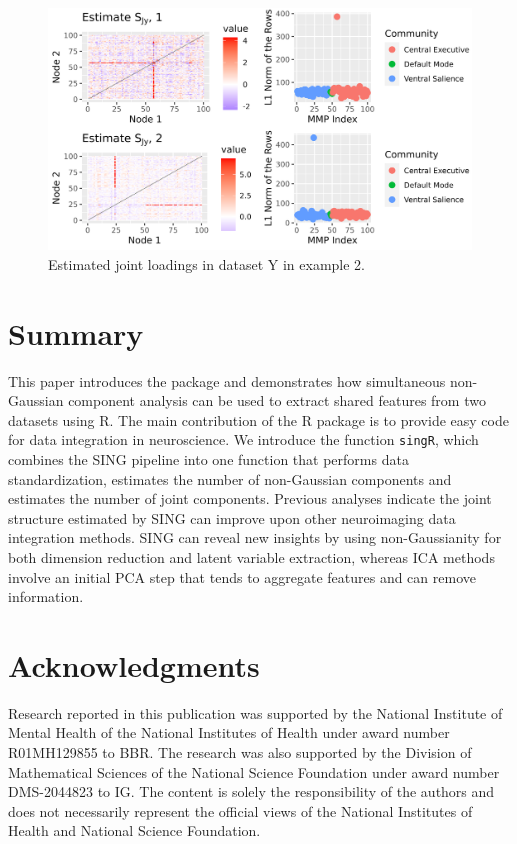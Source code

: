 \begin{figure}
\includegraphics[width=1\linewidth]{figures/ex2estimated_loadingsY} \caption{Estimated joint loadings in dataset Y in example 2.}\label{fig:esty2}
\end{figure}

\hypertarget{summary}{%
\section{Summary}\label{summary}}

This paper introduces the  package and demonstrates how simultaneous non-Gaussian component analysis can be used to extract shared features from two datasets using R. The main contribution of the R package  is to provide easy code for data integration in neuroscience. We introduce the function \texttt{singR}, which combines the SING pipeline into one function that performs data standardization, estimates the number of non-Gaussian components and estimates the number of joint components. Previous analyses indicate the joint structure estimated by SING can improve upon other neuroimaging data integration methods. SING can reveal new insights by using non-Gaussianity for both dimension reduction and latent variable extraction, whereas ICA methods involve an initial PCA step that tends to aggregate features and can remove information.

\hypertarget{acknowledgments}{%
\section{Acknowledgments}\label{acknowledgments}}

Research reported in this publication was supported by the National Institute of Mental Health of the National Institutes of Health under award number R01MH129855 to BBR. The research was also supported by the Division of Mathematical Sciences of the National Science Foundation under award number DMS-2044823 to IG. The content is solely the responsibility of the authors and does not necessarily represent the official views of the National Institutes of Health and National Science Foundation.

